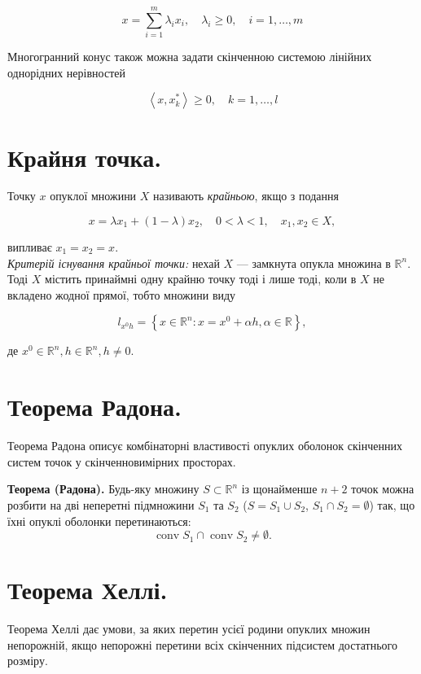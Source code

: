 \documentclass[12pt,a4paper]{extarticle}
\numberwithin{section}{part}
\begin{document}
$$
x=\sum_{i=1}^{m} \lambda_{i} x_{i}, \quad \lambda_{i} \geq 0, \quad i=1, \ldots, m
$$

Многогранний конус також можна задати скінченною системою лінійних однорідних нерівностей

$$
\left\langle x, x_{k}^{*}\right\rangle \geq 0, \quad k=1, \ldots, l
$$


\section{Крайня точка.}
Точку $x$ опуклої множини $X$ називають \textit{крайньою}, якщо з подання

$$
x=\lambda x_{1}+(1-\lambda) x_{2}, \quad 0<\lambda<1, \quad x_{1}, x_{2} \in X,
$$

випливає $x_{1}=x_{2}=x$.\\
\textit{Критерій існування крайньої точки:} нехай $X$ --- замкнута опукла множина в $\mathbb{R}^{n}$. Тоді $X$ містить принаймні одну крайню точку тоді і лише тоді, коли в $X$ не вкладено жодної прямої, тобто множини виду

$$
l_{x^{0} h}=\left\{x \in \mathbb{R}^{n}: x=x^{0}+\alpha h, \alpha \in \mathbb{R}\right\},
$$

де $x^{0} \in \mathbb{R}^{n}, h \in \mathbb{R}^{n}, h \neq 0$.

\section{Теорема Радона.}
Теорема Радона описує комбінаторні властивості опуклих оболонок скінченних систем точок у скінченновимірних просторах.

\textbf{Теорема (Радона).} Будь-яку множину $S \subset \mathbb{R}^n$ із щонайменше $n + 2$ точок можна розбити на дві неперетні підмножини $S_1$ та $S_2$ ($S = S_1 \cup S_2$, $S_1 \cap S_2 = \emptyset$) так, що їхні опуклі оболонки перетинаються:
$$
\operatorname{conv} S_1 \cap \operatorname{conv} S_2 \neq \emptyset.
$$

\section{Теорема Хеллі.}
Теорема Хеллі дає умови, за яких перетин усієї родини опуклих множин непорожній, якщо непорожні перетини всіх скінченних підсистем достатнього розміру.
\end{document}
